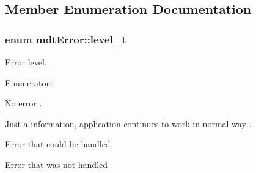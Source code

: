 \subsection{Member Enumeration Documentation}
\hypertarget{classmdt_error_a5c8b1a040e2feaa848f6201d6b6f0cd7}{
\subsubsection[{level\_\-t}]{\setlength{\rightskip}{0pt plus 5cm}enum {\bf mdtError::level\_\-t}}}
\label{classmdt_error_a5c8b1a040e2feaa848f6201d6b6f0cd7}


Error level. 

\begin{Desc}
\item[Enumerator: ]\par
\begin{description}
\item[{\em 
\hypertarget{classmdt_error_a5c8b1a040e2feaa848f6201d6b6f0cd7a1ba619a7f332d8fe18fb3cd270ff86eb}{
NoError}
\label{classmdt_error_a5c8b1a040e2feaa848f6201d6b6f0cd7a1ba619a7f332d8fe18fb3cd270ff86eb}
}]No error . \item[{\em 
\hypertarget{classmdt_error_a5c8b1a040e2feaa848f6201d6b6f0cd7a24688d5f5af0a3a54636fa1a4b2f60fc}{
Info}
\label{classmdt_error_a5c8b1a040e2feaa848f6201d6b6f0cd7a24688d5f5af0a3a54636fa1a4b2f60fc}
}]Just a information, application continues to work in normal way . \item[{\em 
\hypertarget{classmdt_error_a5c8b1a040e2feaa848f6201d6b6f0cd7a61d92805e90226faf3d1c5fd350a0ab8}{
Warning}
\label{classmdt_error_a5c8b1a040e2feaa848f6201d6b6f0cd7a61d92805e90226faf3d1c5fd350a0ab8}
}]Error that could be handled \item[{\em 
\hypertarget{classmdt_error_a5c8b1a040e2feaa848f6201d6b6f0cd7a35f5c05a7d15b6433445cdbffa6d5260}{
Error}
\label{classmdt_error_a5c8b1a040e2feaa848f6201d6b6f0cd7a35f5c05a7d15b6433445cdbffa6d5260}
}]Error that was not handled \end{description}
\end{Desc}



